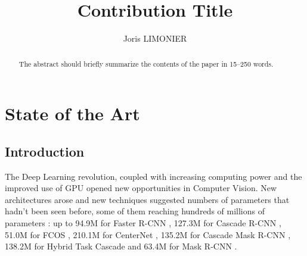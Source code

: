 \documentclass[runningheads]{llncs}
\begin{document}
\title{Contribution Title}

\author{Joris LIMONIER}
%
%
%
\maketitle              %
%
\begin{abstract}
  The abstract should briefly summarize the contents of the paper in
  15--250 words.

\end{abstract}


\section{State of the Art}
\subsection{Introduction}
The Deep Learning revolution, coupled with increasing computing power and the improved use of GPU opened new opportunities in Computer Vision. New architectures arose and new techniques suggested numbers of parameters that hadn't been seen before, some of them reaching hundreds of millions of parameters \cite{hrnet}: up to 94.9M for Faster R-CNN \cite{R-CNN}, 127.3M for Cascade R-CNN \cite{Cascade R-CNN}, 51.0M for FCOS \cite{FCOS}, 210.1M for CenterNet \cite{CenterNet}, 135.2M for Cascade Mask R-CNN \cite{Cascade R-CNN}, 138.2M for Hybrid Task Cascade \cite{Hybrid Task Cascade} and 63.4M for Mask R-CNN \cite{R-CNN}.
\end{document}
